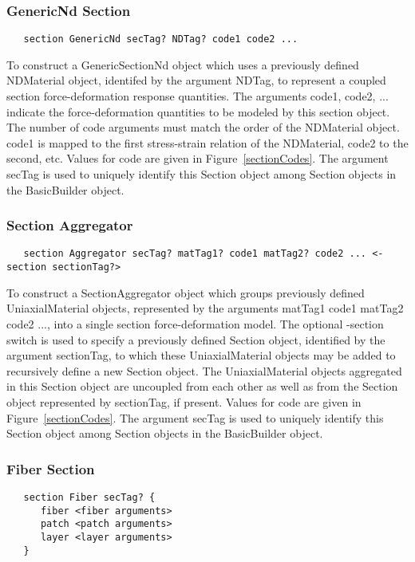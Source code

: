 \documentclass[12pt]{article}
\begin{document}
\subsubsection{GenericNd Section}
{\sf\small
\begin{verbatim}
   section GenericNd secTag? NDTag? code1 code2 ...
\end{verbatim}
}

To construct a GenericSectionNd object which uses a previously defined
NDMaterial object, identifed by the argument NDTag, to represent
a coupled section force-deformation response quantities. The arguments code1, 
code2, ... indicate the force-deformation quantities to be modeled by
this section object. The number of code arguments must match the order
of the NDMaterial object. code1 is mapped to the first stress-strain
relation of the NDMaterial, code2 to the second, etc. Values for code
are given in Figure~\ref{sectionCodes}. The argument secTag is used to
uniquely identify this Section object among Section objects in the
BasicBuilder object. 

\subsubsection{Section Aggregator}
{\sf\small
\begin{verbatim}
   section Aggregator secTag? matTag1? code1 matTag2? code2 ... <-section sectionTag?>
\end{verbatim}
}

To construct a SectionAggregator object which groups
previously defined UniaxialMaterial objects, represented by the
arguments matTag1 code1 matTag2 code2 ..., into a single section
force-deformation model. The optional -section switch is used to
specify a previously defined Section object, identified by the
argument sectionTag, to which these UniaxialMaterial objects may be
added to recursively define a new Section object. The UniaxialMaterial
objects aggregated in this Section object are uncoupled from each
other as well as from the Section object represented by sectionTag, if
present. Values for code are given in Figure~\ref{sectionCodes}. The
argument secTag is used to uniquely identify this Section object among
Section objects in the BasicBuilder object. 

\subsubsection{Fiber Section}
{\sf\small
\begin{verbatim}
   section Fiber secTag? {
      fiber <fiber arguments>
      patch <patch arguments>
      layer <layer arguments>
   }
\end{verbatim}
}
\end{document}
